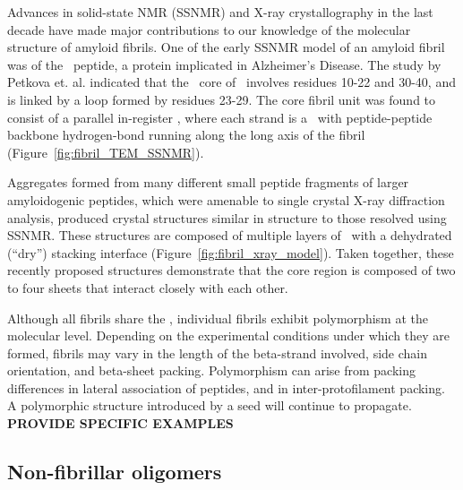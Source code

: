 
Advances in solid-state NMR (SSNMR) and X-ray crystallography in the last decade have made major contributions to our knowledge of the molecular structure of amyloid fibrils. One of the early SSNMR model of an amyloid fibril was of the \ peptide, a protein implicated in Alzheimer's Disease. The study by Petkova et. al.\cite{Petkova:2006gx} indicated that the \bsheet\ core of \ involves residues 10-22 and 30-40, and is linked by a loop formed by residues 23-29. The core fibril unit was found to consist of a parallel in-register \bsheet, where each strand is a \bhairpin\ with peptide-peptide backbone hydrogen-bond running along the long axis of the fibril (Figure~\ref{fig:fibril_TEM_SSNMR}).

Aggregates formed from many different small peptide fragments of larger amyloidogenic peptides, which were amenable to single crystal X-ray diffraction analysis, produced crystal structures similar in structure to those resolved using SSNMR. These structures are composed of multiple layers of \bsheet\ with a dehydrated (``dry'') stacking interface (Figure~\ref{fig:fibril_xray_model}). Taken together, these recently proposed structures demonstrate that the core region is composed of two to four sheets that interact closely with each other. %

Although all fibrils share the \crossbs, individual fibrils exhibit polymorphism at the molecular level. Depending on the experimental conditions under which they are formed, fibrils may vary in the length of the beta-strand involved, side chain orientation, and beta-sheet packing.\cite{Kodali:2007cz}
Polymorphism can arise from packing differences in lateral association of peptides, and in inter-protofilament packing. A polymorphic structure introduced by a seed will continue to propagate.\cite{some new papers,petkova polymorphism in Abeta} %
\textbf{PROVIDE SPECIFIC EXAMPLES}

\subsection{Non-fibrillar oligomers}


